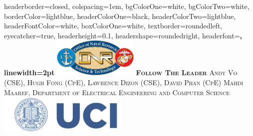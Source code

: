 \documentclass[landscape,a0paper,fontscale=0.35]{baposter} %
\begin{document}
\begin{poster}
{
headerborder=closed, %
colspacing=1em, %
bgColorOne=white, %
bgColorTwo=white, %
borderColor=lightblue, %
headerColorOne=black, %
headerColorTwo=lightblue, %
headerFontColor=white, %
boxColorOne=white, %
textborder=roundedleft, %
eyecatcher=true, %
headerheight=0.1\textheight, %
headershape=roundedright, %
headerfont=\Large\bf\textsc, %
linewidth=2pt %
}
%
{\includegraphics[height=5em]{ONR_logo.png}} %
{\bf\textsc{Follow The Leader}\vspace{0.1em}} %
{\textsc{ Andy Vo (CSE), Hugh Fong (CpE), Lawrence Dizon (CSE), David Phan (CpE)  \hspace{15pt} Mahdi Maaref, Department of Electrical Engineering and Computer Science} } %
{\includegraphics[height=5em]{UCI_Logo.png}} %


\end{poster}
\end{document}
